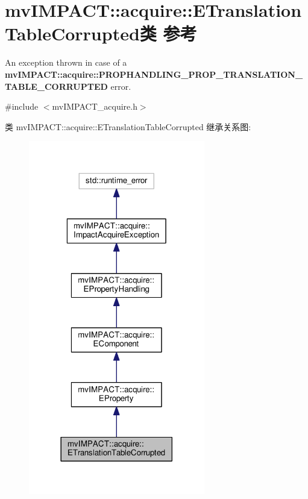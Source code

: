 \hypertarget{classmv_i_m_p_a_c_t_1_1acquire_1_1_e_translation_table_corrupted}{\section{mv\+I\+M\+P\+A\+C\+T\+:\+:acquire\+:\+:E\+Translation\+Table\+Corrupted类 参考}
\label{classmv_i_m_p_a_c_t_1_1acquire_1_1_e_translation_table_corrupted}
}


An exception thrown in case of a {\bfseries mv\+I\+M\+P\+A\+C\+T\+::acquire\+::\+P\+R\+O\+P\+H\+A\+N\+D\+L\+I\+N\+G\+\_\+\+P\+R\+O\+P\+\_\+\+T\+R\+A\+N\+S\+L\+A\+T\+I\+O\+N\+\_\+\+T\+A\+B\+L\+E\+\_\+\+C\+O\+R\+R\+U\+P\+T\+E\+D} error.  




{\ttfamily \#include $<$mv\+I\+M\+P\+A\+C\+T\+\_\+acquire.\+h$>$}



类 mv\+I\+M\+P\+A\+C\+T\+:\+:acquire\+:\+:E\+Translation\+Table\+Corrupted 继承关系图\+:
\nopagebreak
\begin{figure}[H]
\begin{center}
\leavevmode
\includegraphics[width=218pt]{classmv_i_m_p_a_c_t_1_1acquire_1_1_e_translation_table_corrupted__inherit__graph}
\end{center}
\end{figure}


